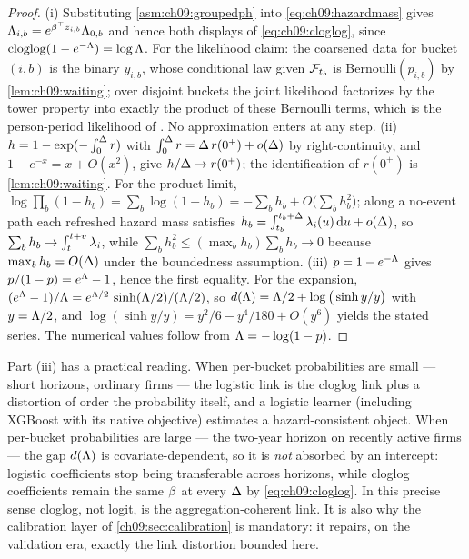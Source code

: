 \begin{proof}
(i) Substituting \cref{asm:ch09:groupedph} into
\cref{eq:ch09:hazardmass} gives $\Lambda_{i,b} = e^{\beta^{\top}z_{i,b}}
\Lambda_{0,b}$ and hence both displays of \cref{eq:ch09:cloglog}, since
$\operatorname{cloglog}(1 - e^{-\Lambda}) = \log \Lambda$. For the likelihood
claim: the coarsened data for bucket $(i,b)$ is the binary $y_{i,b}$,
whose conditional law given $\mathcal{F}_{t_b}$ is Bernoulli$(p_{i,b})$ by
\cref{lem:ch09:waiting}; over disjoint buckets the joint likelihood
factorizes by the tower property into exactly the product of these
Bernoulli terms, which is the person-period likelihood of
\citet{allison1982}. No approximation enters at any step.
(ii) $h = 1 - \exp(-\int_0^{\Delta} r)$ with $\int_0^{\Delta} r =
\Delta\, r(0^+) + o(\Delta)$ by right-continuity, and
$1 - e^{-x} = x + O(x^2)$, give $h/\Delta \to r(0^+)$; the
identification of $r(0^+)$ is \cref{lem:ch09:waiting}. For the product
limit, $\log \prod_b (1-h_b) = \sum_b \log(1-h_b) = -\sum_b h_b +
O\big(\sum_b h_b^2\big)$; along a no-event path each refreshed hazard
mass satisfies $h_b = \int_{t_b}^{t_b+\Delta} \lambda_i(u)\,\mathrm{d} u +
o(\Delta)$, so $\sum_b h_b \to \int_t^{t+v} \lambda_i$, while
$\sum_b h_b^2 \le (\max_b h_b) \sum_b h_b \to 0$ because
$\max_b h_b = O(\Delta)$ under the boundedness assumption.
(iii) $p = 1 - e^{-\Lambda}$ gives $p/(1-p) = e^{\Lambda}-1$, hence the first
equality. For the expansion, $(e^{\Lambda}-1)/\Lambda = e^{\Lambda/2}\,
\sinh(\Lambda/2)/(\Lambda/2)$, so $d(\Lambda) = \Lambda/2 + \log\big(\sinh y / y\big)$
with $y = \Lambda/2$, and $\log(\sinh y/y) = y^2/6 - y^4/180 + O(y^6)$
yields the stated series. The numerical values follow from
$\Lambda = -\log(1-p)$.
\end{proof}

Part (iii) has a practical reading. When per-bucket probabilities
are small --- short horizons, ordinary firms --- the logistic link is the
cloglog link plus a distortion of order the probability itself, and a
logistic learner (including XGBoost with its native
 objective) estimates a hazard-consistent object.
When per-bucket probabilities are large --- the two-year horizon on
recently active firms --- the gap $d(\Lambda)$ is covariate-dependent, so it
is \emph{not} absorbed by an intercept: logistic coefficients stop being
transferable across horizons, while cloglog coefficients remain the same
$\beta$ at every $\Delta$ by \cref{eq:ch09:cloglog}. In this precise
sense cloglog, not logit, is the aggregation-coherent link. It is also
why the calibration layer of \cref{ch09:sec:calibration} is mandatory:
it repairs, on the validation era, exactly the link distortion bounded
here.

